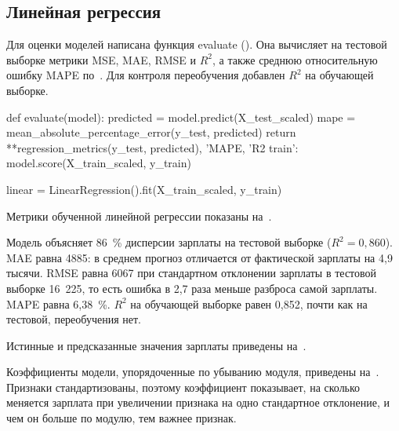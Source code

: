 \documentclass[a4paper,14pt]{extarticle}
\begin{document}

\subsection{Линейная регрессия}

Для оценки моделей написана функция evaluate (). Она вычисляет на тестовой выборке метрики MSE, MAE, RMSE и $R^2$, а также среднюю относительную ошибку MAPE по~. Для контроля переобучения добавлен $R^2$ на обучающей выборке.


    def evaluate(model):
        predicted = model.predict(X_test_scaled)
        mape = mean_absolute_percentage_error(y_test, predicted)
        return {**regression_metrics(y_test, predicted),
                'MAPE, %
                'R2 train': model.score(X_train_scaled, y_train)}


    linear = LinearRegression().fit(X_train_scaled, y_train)

Метрики обученной линейной регрессии показаны на~.


Модель объясняет 86~\% дисперсии зарплаты на тестовой выборке ($R^2 = 0{,}860$). MAE равна 4885: в среднем прогноз отличается от фактической зарплаты на 4,9 тысячи. RMSE равна 6067 при стандартном отклонении зарплаты в тестовой выборке 16~225, то есть ошибка в 2,7 раза меньше разброса самой зарплаты. MAPE равна 6,38~\%. $R^2$ на обучающей выборке равен 0,852, почти как на тестовой, переобучения нет.

Истинные и предсказанные значения зарплаты приведены на~.


Коэффициенты модели, упорядоченные по убыванию модуля, приведены на~. Признаки стандартизованы, поэтому коэффициент показывает, на сколько меняется зарплата при увеличении признака на одно стандартное отклонение, и чем он больше по модулю, тем важнее признак.

\end{document}
